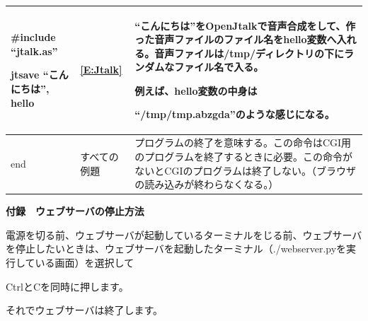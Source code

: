 \documentclass[a4paper,12pt,dvipdfmx]{jarticle}
\begin{document}
\begin{flushleft}
\begin{supertabular}{|m{5.467cm}|m{3.181cm}|m{7.7cm}|}
		\#include “jtalk.as”

		jtsave “こんにちは”, hello &
		\ref*{E:Jtalk} &
		“こんにちは”をOpenJtalkで音声合成をして、作った音声ファイルのファイル名をhello変数へ入れる。音声ファイルは/tmp/ディレクトリの下にランダムなファイル名で入る。

		例えば、hello変数の中身は

		“/tmp/tmp.abzgda”のような感じになる。 \\\hline
		end &
		すべての例題 &
		プログラムの終了を意味する。この命令はCGI用のプログラムを終了するときに必要。この命令がないとCGIのプログラムは終了しない。（ブラウザの読み込みが終わらなくなる。）\\\hline
	\end{supertabular}
\end{flushleft}

\bigskip

{\bfseries
	付録　ウェブサーバの停止方法}

電源を切る前、ウェブサーバが起動しているターミナルをじる前、ウェブサーバを停止したいときは、ウェブサーバを起動したターミナル（./webserver.pyを実行している画面）を選択して


\bigskip

CtrlとCを同時に押します。


\bigskip

それでウェブサーバは終了します。


\bigskip


\bigskip


\bigskip
\end{document}
